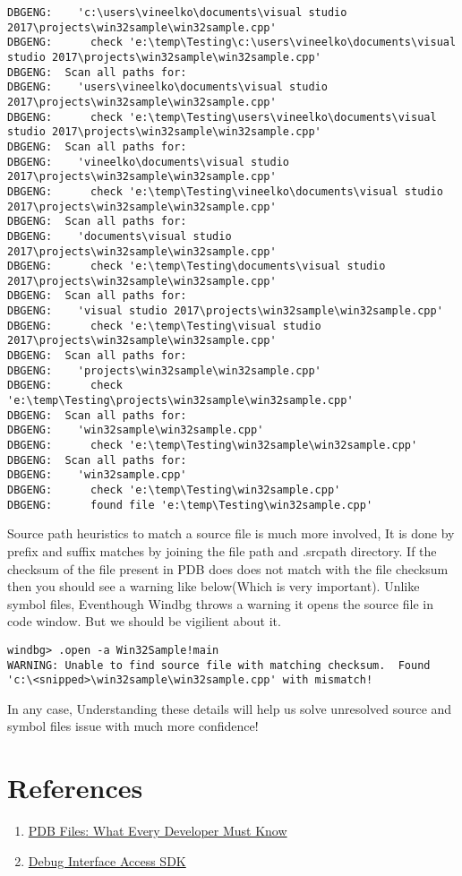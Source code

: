 \documentclass{article}
\begin{document}
\begin{verbatim}
DBGENG:    'c:\users\vineelko\documents\visual studio 2017\projects\win32sample\win32sample.cpp'
DBGENG:      check 'e:\temp\Testing\c:\users\vineelko\documents\visual studio 2017\projects\win32sample\win32sample.cpp'
DBGENG:  Scan all paths for:
DBGENG:    'users\vineelko\documents\visual studio 2017\projects\win32sample\win32sample.cpp'
DBGENG:      check 'e:\temp\Testing\users\vineelko\documents\visual studio 2017\projects\win32sample\win32sample.cpp'
DBGENG:  Scan all paths for:
DBGENG:    'vineelko\documents\visual studio 2017\projects\win32sample\win32sample.cpp'
DBGENG:      check 'e:\temp\Testing\vineelko\documents\visual studio 2017\projects\win32sample\win32sample.cpp'
DBGENG:  Scan all paths for:
DBGENG:    'documents\visual studio 2017\projects\win32sample\win32sample.cpp'
DBGENG:      check 'e:\temp\Testing\documents\visual studio 2017\projects\win32sample\win32sample.cpp'
DBGENG:  Scan all paths for:
DBGENG:    'visual studio 2017\projects\win32sample\win32sample.cpp'
DBGENG:      check 'e:\temp\Testing\visual studio 2017\projects\win32sample\win32sample.cpp'
DBGENG:  Scan all paths for:
DBGENG:    'projects\win32sample\win32sample.cpp'
DBGENG:      check 'e:\temp\Testing\projects\win32sample\win32sample.cpp'
DBGENG:  Scan all paths for:
DBGENG:    'win32sample\win32sample.cpp'
DBGENG:      check 'e:\temp\Testing\win32sample\win32sample.cpp'
DBGENG:  Scan all paths for:
DBGENG:    'win32sample.cpp'
DBGENG:      check 'e:\temp\Testing\win32sample.cpp'
DBGENG:      found file 'e:\temp\Testing\win32sample.cpp'
\end{verbatim}

Source path heuristics to match a source file is much more involved, It is done by prefix and suffix matches by joining the file path and .srcpath directory. If the checksum of the file present in PDB does does not match with the file checksum then you should see a warning like below(Which is very important). Unlike symbol files, Eventhough Windbg throws a warning it opens the source file in code window. But we should be vigilient about it.
\begin{verbatim}
windbg> .open -a Win32Sample!main
WARNING: Unable to find source file with matching checksum.  Found 'c:\<snipped>\win32sample\win32sample.cpp' with mismatch!
\end{verbatim}

In any case, Understanding these details will help us solve unresolved source and symbol files issue with much more confidence!

\section{References}
\begin{enumerate}[noitemsep]
\item \href{https://www.wintellect.com/pdb-files-what-every-developer-must-know/}{PDB Files: What Every Developer Must Know}
\item \href{https://docs.microsoft.com/en-us/visualstudio/debugger/debug-interface-access/debug-interface-access-sdk}{Debug Interface Access SDK}
\end{enumerate}
\end{document}
